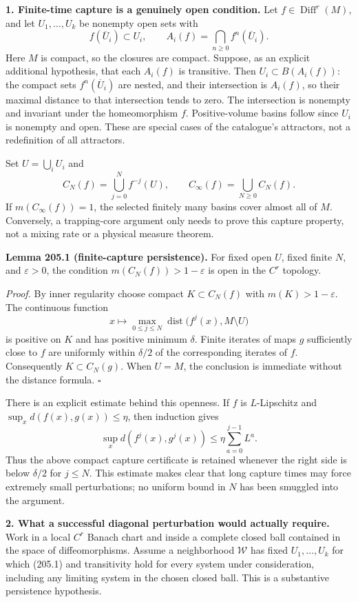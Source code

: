\documentclass[11pt,a4paper]{article}
\begin{document}
\textbf{1. Finite-time capture is a genuinely open condition.}
Let $f\in\operatorname{Diff}^r(M)$, and let $U_1,\ldots,U_k$ be nonempty
open sets with
\[
 f(\overline U_i)\subset U_i,\qquad
 A_i(f)=\bigcap_{n\ge0}f^n(\overline U_i).
 \tag{205.1}
\]
Here $M$ is compact, so the closures are compact. Suppose, as an explicit
additional hypothesis, that each $A_i(f)$ is transitive. Then
$U_i\subset B(A_i(f))$: the compact sets $f^n(\overline U_i)$ are nested,
and their intersection is $A_i(f)$, so their maximal distance to that
intersection tends to zero. The intersection is nonempty and invariant
under the homeomorphism $f$. Positive-volume basins follow since $U_i$
is nonempty and open. These are special cases of the catalogue's
attractors, not a redefinition of all attractors.

Set $U=\bigcup_iU_i$ and
\[
 C_N(f)=\bigcup_{j=0}^{N}f^{-j}(U),\qquad
 C_\infty(f)=\bigcup_{N\ge0}C_N(f).
\]
If $m(C_\infty(f))=1$, the selected finitely many basins cover almost
all of $M$. Conversely, a trapping-core argument only needs to prove
this capture property, not a mixing rate or a physical measure theorem.

\textbf{Lemma 205.1 (finite-capture persistence).}
For fixed open $U$, fixed finite $N$, and $\varepsilon>0$, the condition
$m(C_N(f))>1-\varepsilon$ is open in the $C^r$ topology.

\emph{Proof.}
By inner regularity choose compact $K\subset C_N(f)$ with
$m(K)>1-\varepsilon$. The continuous function
\[
 x\longmapsto \max_{0\le j\le N}
 \operatorname{dist}\bigl(f^j(x),M\setminus U\bigr)
\]
is positive on $K$ and has positive minimum $\delta$. Finite iterates
of maps $g$ sufficiently close to $f$ are uniformly within $\delta/2$
of the corresponding iterates of $f$. Consequently $K\subset C_N(g)$.
When $U=M$, the conclusion is immediate without the distance formula.
\hfill$\square$

There is an explicit estimate behind this openness. If $f$ is
$L$-Lipschitz and $\sup_xd(f(x),g(x))\le\eta$, then induction gives
\[
 \sup_xd(f^j(x),g^j(x))
 \le\eta\sum_{a=0}^{j-1}L^a. \tag{205.2}
\]
Thus the above compact capture certificate is retained whenever the
right side is below $\delta/2$ for $j\le N$. This estimate makes clear
that long capture times may force extremely small perturbations; no
uniform bound in $N$ has been smuggled into the argument.

\textbf{2. What a successful diagonal perturbation would actually require.}
Work in a local $C^r$ Banach chart and inside a complete closed ball
contained in the space of diffeomorphisms. Assume a neighborhood
$\mathcal W$ has fixed $U_1,\ldots,U_k$ for which (205.1) and transitivity
hold for every system under consideration, including any limiting system
in the chosen closed ball. This is a substantive persistence hypothesis.
\end{document}
